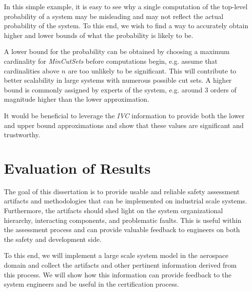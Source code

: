 In this simple example, it is easy to see why a single computation of the top-level probability of a system may be misleading and may not reflect the actual probability of the system. To this end, we wish to find a way to accurately obtain higher and lower bounds of what the probability is likely to be. 

A lower bound for the probability can be obtained by choosing a maximum cardinality for \textit{MinCutSets} before computations begin, e.g. assume that cardinalities above $n$ are too unlikely to be significant. This will contribute to better scalability in large systems with numerous possible cut sets. A higher bound is commonly assigned by experts of the system, e.g. around 3 orders of magnitude higher than the lower approximation. 

It would be beneficial to leverage the \textit{IVC} information to provide both the lower and upper bound approximations and show that these values are significant and trustworthy. 



\section{Evaluation of Results}
The goal of this dissertation is to provide usable and reliable safety assessment artifacts and methodologies that can be implemented on industrial scale systems. Furthermore, the artifacts should shed light on the system organizational hierarchy, interacting components, and problematic faults. This is useful within the assessment process and can provide valuable feedback to engineers on both the safety and development side. 

To this end, we will implement a large scale system model in the aerospace domain and collect the artifacts and other pertinent information derived from this process. We will show how this information can provide feedback to the system engineers and be useful in the certification process. 


